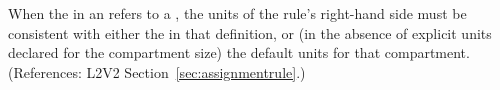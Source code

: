 When the  in an \AssignmentRule refers to a \Compartment,
the units of the rule's right-hand side must be consistent with either the
 in that \Compartment definition, or (in the absence of
explicit units declared for the compartment size) the default units for
that compartment.  (References: L2V2 Section~\ref{sec:assignmentrule}.)
